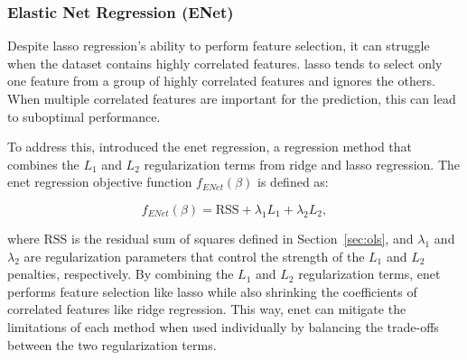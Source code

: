\subsubsection{Elastic Net Regression (ENet)}
Despite \gls{lasso} regression's ability to perform feature selection, it can struggle when the dataset contains highly correlated features.
\gls{lasso} tends to select only one feature from a group of highly correlated features and ignores the others.
When multiple correlated features are important for the prediction, this can lead to suboptimal performance.

To address this, \citet{zou_regularization_2005} introduced the \gls{enet} regression, a regression method that combines the $L_1$ and $L_2$ regularization terms from ridge and \gls{lasso} regression.
The \gls{enet} regression objective function $f_{ENet}(\beta)$ is defined as:

$$
f_{ENet}(\beta) = \text{RSS} + \lambda_1 L_1 + \lambda_2 L_2,
$$

where $\text{RSS}$ is the residual sum of squares defined in Section~\ref{sec:ols}, and $\lambda_1$ and $\lambda_2$ are regularization parameters that control the strength of the $L_1$ and $L_2$ penalties, respectively.
By combining the $L_1$ and $L_2$ regularization terms, \gls{enet} performs feature selection like \gls{lasso} while also shrinking the coefficients of correlated features like ridge regression.
This way, \gls{enet} can mitigate the limitations of each method when used individually by balancing the trade-offs between the two regularization terms.